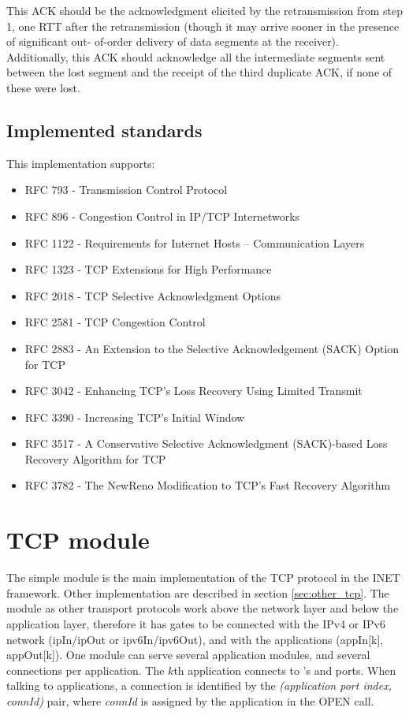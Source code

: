        This ACK should be the acknowledgment elicited by the
       retransmission from step 1, one RTT after the retransmission
       (though it may arrive sooner in the presence of significant out-
       of-order delivery of data segments at the receiver).
       Additionally, this ACK should acknowledge all the intermediate
       segments sent between the lost segment and the receipt of the
       third duplicate ACK, if none of these were lost.

\subsection{Implemented standards}

This implementation supports:
\begin{itemize}
\item RFC 793 - Transmission Control Protocol
\item RFC 896 - Congestion Control in IP/TCP Internetworks
\item RFC 1122 - Requirements for Internet Hosts -- Communication Layers
\item RFC 1323 - TCP Extensions for High Performance
\item RFC 2018 - TCP Selective Acknowledgment Options
\item RFC 2581 - TCP Congestion Control
\item RFC 2883 - An Extension to the Selective Acknowledgement (SACK) Option for TCP
\item RFC 3042 - Enhancing TCP's Loss Recovery Using Limited Transmit
\item RFC 3390 - Increasing TCP's Initial Window
\item RFC 3517 - A Conservative Selective Acknowledgment (SACK)-based Loss Recovery
                 Algorithm for TCP
\item RFC 3782 - The NewReno Modification to TCP's Fast Recovery Algorithm
\end{itemize}


\section{TCP module}

The  simple module is the main implementation of the TCP protocol in the INET framework.
Other implementation are described in section \ref{sec:other_tcp}.
The  module as other transport protocols work above the network layer and below the application
layer, therefore it has gates to be connected with the IPv4 or IPv6 network (ipIn/ipOut or ipv6In/ipv6Out),
and with the applications (appIn[k], appOut[k]).
One  module can serve several application modules, and several
connections per application. The $k$th application connects to 's
 and  ports. When talking to applications, a
connection is identified by the \textit{(application port index, connId)} pair,
where \textit{connId} is assigned by the application in the OPEN call.

